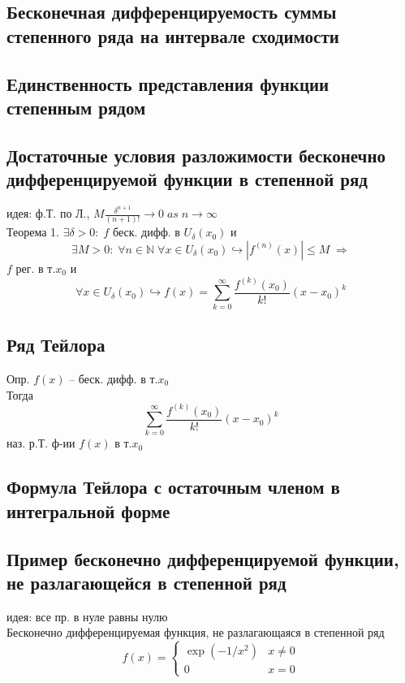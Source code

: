 \documentclass{article}
\begin{document}
\subsection{Бесконечная дифференцируемость суммы степенного ряда на интервале сходимости}
\subsection{Единственность представления функции степенным рядом}
\subsection{Достаточные условия разложимости бесконечно дифференцируемой функции в степенной ряд}
идея: ф.Т. по Л., $M \frac{\delta^{n+1}}{(n+1)!} \rightarrow 0 \; as \; n \rightarrow \infty$ \\
Теорема 1. $\exists \delta > 0: \; f$ беск. дифф. в $U_\delta (x_0)$ и 
\begin{equation*}
    \exists M > 0: \; \forall n \in \mathbb N \; \forall x \in U_\delta (x_0) \hookrightarrow |f^{(n)}(x)| \leq M \; \Rightarrow
\end{equation*}
$f$ рег. в т.$x_0$ и
\begin{equation*}
    \forall x \in U_\delta (x_0) \hookrightarrow f(x) = \sum_{k=0}^\infty \frac{f^{(k)} (x_0)}{k!} (x-x_0)^k
\end{equation*}
\subsection{Ряд Тейлора}
Опр. $f(x)$ -- беск. дифф. в т.$x_0$ \\
Тогда
\begin{equation*}
    \sum_{k=0}^\infty \frac{f^{(k)} (x_0)}{k!} (x-x_0)^k
\end{equation*}
наз. р.Т. ф-ии $f(x)$ в т.$x_0$
\subsection{Формула Тейлора с остаточным членом в интегральной форме}
\subsection{Пример бесконечно дифференцируемой функции, не разлагающейся в степенной ряд}
идея: все пр. в нуле равны нулю \\
Бесконечно дифференцируемая функция, не разлагающаяся в степенной ряд
\begin{equation*}
    f(x) = 
    \begin{cases}
    \exp (-1/x^2) & x \neq 0 \\
    0 & x=0
    \end{cases}
\end{equation*}
\end{document}
